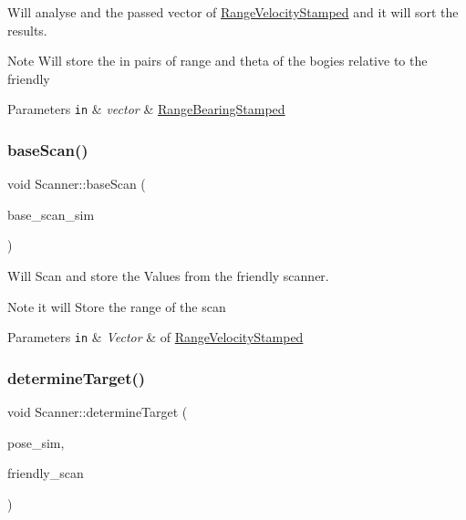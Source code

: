 Will analyse and the passed vector of \hyperlink{structRangeVelocityStamped}{Range\+Velocity\+Stamped} and it will sort the results. 

\begin{DoxyNote}{Note}
Will store the in pairs of range and theta of the bogies relative to the friendly 
\end{DoxyNote}

\begin{DoxyParams}[1]{Parameters}
\mbox{\tt in}  & {\em vector} & \hyperlink{structRangeBearingStamped}{Range\+Bearing\+Stamped} \\
\hline
\end{DoxyParams}
\mbox{\label{classScanner_ad18851f19a61b642c699f425b62911a4}} 
\subsubsection{\texorpdfstring{base\+Scan()}{baseScan()}}
{\footnotesize\ttfamily void Scanner\+::base\+Scan (\begin{DoxyParamCaption}\item[{std\+::vector$<$ \hyperlink{structRangeVelocityStamped}{Range\+Velocity\+Stamped} $>$ \&}]{base\+\_\+scan\+\_\+sim }\end{DoxyParamCaption})}



Will Scan and store the Values from the friendly scanner. 

\begin{DoxyNote}{Note}
it will Store the range of the scan 
\end{DoxyNote}

\begin{DoxyParams}[1]{Parameters}
\mbox{\tt in}  & {\em Vector} & of \hyperlink{structRangeVelocityStamped}{Range\+Velocity\+Stamped} \\
\hline
\end{DoxyParams}
\mbox{\label{classScanner_a846ec9883243c9837e0a910cd82e969d}} 
\subsubsection{\texorpdfstring{determine\+Target()}{determineTarget()}}
{\footnotesize\ttfamily void Scanner\+::determine\+Target (\begin{DoxyParamCaption}\item[{\hyperlink{structPose}{Pose}}]{pose\+\_\+sim,  }\item[{std\+::vector$<$ \hyperlink{structRangeBearingStamped}{Range\+Bearing\+Stamped} $>$}]{friendly\+\_\+scan }\end{DoxyParamCaption})}



